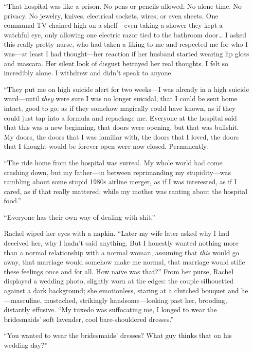``That hospital was like a prison. No pens or pencils allowed. No alone
time. No privacy. No jewelry, knives, electrical sockets, wires, or even
sheets. One communal TV chained high on a shelf---even taking a shower
they kept a watchful eye, only allowing one electric razor tied to the
bathroom door\ldots{} I asked this really pretty nurse, who had taken a
liking to me and respected me for who I was---at least I had
thought---her reaction if her husband started wearing lip gloss and
mascara. Her silent look of disgust betrayed her real thoughts. I felt
so incredibly alone. I withdrew and didn't speak to anyone.

``They put me on high suicide alert for two weeks---I was already in a
high suicide ward---until \emph{they} were sure I was no longer
suicidal, that I could be sent home intact, good to go; as if they
somehow magically could have known, as if they could just tap into a
formula and repackage me. Everyone at the hospital said that this was a
new beginning, that doors were opening, but that was bullshit. My doors,
the doors that I was familiar with, the doors that I loved, the doors
that I thought would be forever open were now closed. Permanently.

``The ride home from the hospital was surreal. My whole world had come
crashing down, but my father---in between reprimanding my
stupidity---was rambling about some stupid 1980s airline merger, as if I
was interested, as if I cared, as if that really mattered; while my
mother was ranting about the hospital food.''

``Everyone has their own way of dealing with shit.''

Rachel wiped her eyes with a napkin. ``Later my wife later asked why I
had deceived her, why I hadn't said anything. But I honestly wanted
nothing more than a normal relationship with a normal woman, assuming
that \emph{this} would go away, that marriage would somehow make me
normal, that marriage would stifle these feelings once and for all. How
naïve was that?'' From her purse, Rachel displayed a wedding photo,
slightly worn at the edges: the couple silhouetted against a dark
background; she emotionless, staring at a clutched bouquet and
he---masculine, mustached, strikingly handsome---looking past her,
brooding, distantly effusive. ``My tuxedo was suffocating me, I longed
to wear the bridesmaids' soft lavender, cool bare-shouldered dresses.''

``You wanted to wear the bridesmaids' dresses? What guy thinks that on
his wedding day?''

